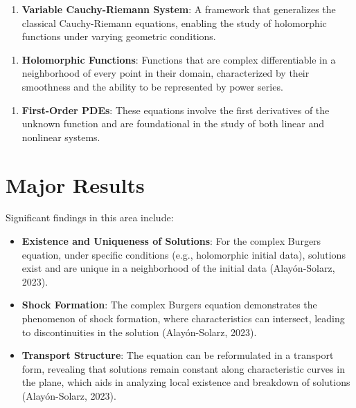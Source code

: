 \documentclass[11pt,a4paper]{article}
\begin{document}
\begin{enumerate}
\item \textbf{Variable Cauchy-Riemann System}: A framework that generalizes the classical Cauchy-Riemann equations, enabling the study of holomorphic functions under varying geometric conditions.
\end{enumerate}

\begin{enumerate}
\item \textbf{Holomorphic Functions}: Functions that are complex differentiable in a neighborhood of every point in their domain, characterized by their smoothness and the ability to be represented by power series.
\end{enumerate}

\begin{enumerate}
\item \textbf{First-Order PDEs}: These equations involve the first derivatives of the unknown function and are foundational in the study of both linear and nonlinear systems.
\end{enumerate}

\section{Major Results}

Significant findings in this area include:

\begin{itemize}
\item \textbf{Existence and Uniqueness of Solutions}: For the complex Burgers equation, under specific conditions (e.g., holomorphic initial data), solutions exist and are unique in a neighborhood of the initial data (Alayón-Solarz, 2023).
\end{itemize}

\begin{itemize}
\item \textbf{Shock Formation}: The complex Burgers equation demonstrates the phenomenon of shock formation, where characteristics can intersect, leading to discontinuities in the solution (Alayón-Solarz, 2023).
\end{itemize}

\begin{itemize}
\item \textbf{Transport Structure}: The equation can be reformulated in a transport form, revealing that solutions remain constant along characteristic curves in the plane, which aids in analyzing local existence and breakdown of solutions (Alayón-Solarz, 2023).
\end{itemize}
\end{document}
